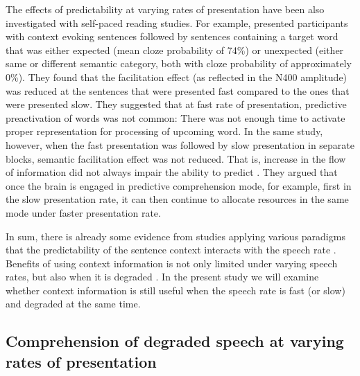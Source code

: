\documentclass[a4paper, nobind]{templates/ociamthesis}
\begin{document}
The effects of predictability at varying rates of presentation have been also investigated with self-paced reading studies.
For example, \textcite{Wlotko2015} presented participants with context evoking sentences followed by sentences containing a target word that was either expected (mean cloze probability of 74\%) or unexpected (either same or different semantic category, both with cloze probability of approximately 0\%).
They found that the facilitation effect (as reflected in the N400 amplitude) was reduced at the sentences that were presented fast compared to the ones that were presented slow.
They suggested that at fast rate of presentation, predictive preactivation of words was not common: There was not enough time to activate proper representation for processing of upcoming word.
In the same study, however, when the fast presentation was followed by slow presentation in separate blocks, semantic facilitation effect was not reduced.
That is, increase in the flow of information did not always impair the ability to predict \autocite[see also,][]{Cole2020}.
They argued that once the brain is engaged in predictive comprehension mode, for example, first in the slow presentation rate, it can then continue to allocate resources in the same mode under faster presentation rate.

In sum, there is already some evidence from studies applying various paradigms that the predictability of the sentence context interacts with the speech rate \autocite{Sharit2003,Aydelott2004,Wlotko2015,Winn2021b}.
Benefits of using context information is not only limited under varying speech rates, but also when it is degraded \autocite{Sheldon2008a,Sheldon2008b,Obleser2010,Bhandari2021}.
In the present study we will examine whether context information is still useful when the speech rate is fast (or slow) and degraded at the same time.

\hypertarget{comprehension-of-degraded-speech-at-varying-rates-of-presentation}{%
\subsection{Comprehension of degraded speech at varying rates of presentation}\label{comprehension-of-degraded-speech-at-varying-rates-of-presentation}}
\end{document}
